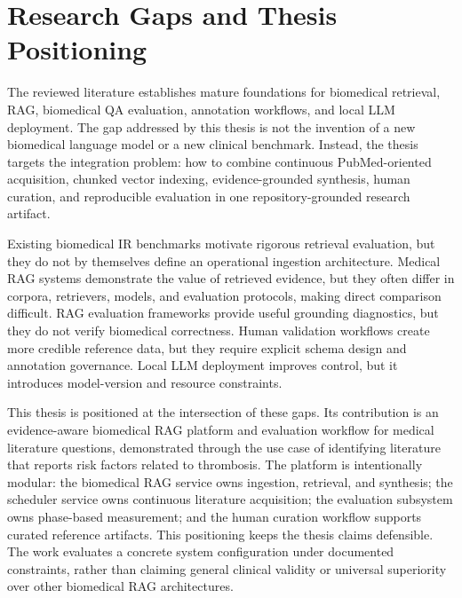 \section{Research Gaps and Thesis Positioning}

The reviewed literature establishes mature foundations for biomedical retrieval, RAG, biomedical QA evaluation, annotation workflows, and local LLM deployment. The gap addressed by this thesis is not the invention of a new biomedical language model or a new clinical benchmark. Instead, the thesis targets the integration problem: how to combine continuous PubMed-oriented acquisition, chunked vector indexing, evidence-grounded synthesis, human curation, and reproducible evaluation in one repository-grounded research artifact.

Existing biomedical IR benchmarks motivate rigorous retrieval evaluation, but they do not by themselves define an operational ingestion architecture. Medical RAG systems demonstrate the value of retrieved evidence, but they often differ in corpora, retrievers, models, and evaluation protocols, making direct comparison difficult. RAG evaluation frameworks provide useful grounding diagnostics, but they do not verify biomedical correctness. Human validation workflows create more credible reference data, but they require explicit schema design and annotation governance. Local LLM deployment improves control, but it introduces model-version and resource constraints.

This thesis is positioned at the intersection of these gaps. Its contribution is an evidence-aware biomedical RAG platform and evaluation workflow for medical literature questions, demonstrated through the use case of identifying literature that reports risk factors related to thrombosis. The platform is intentionally modular: the biomedical RAG service owns ingestion, retrieval, and synthesis; the scheduler service owns continuous literature acquisition; the evaluation subsystem owns phase-based measurement; and the human curation workflow supports curated reference artifacts. This positioning keeps the thesis claims defensible. The work evaluates a concrete system configuration under documented constraints, rather than claiming general clinical validity or universal superiority over other biomedical RAG architectures.
